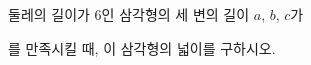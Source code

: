 둘레의 길이가 $6$인 삼각형의 세 변의 길이 $a$, $b$, $c$가\par\smallskip{}\par\smallskip\noindent 를 만족시킬 때, 이 삼각형의 넓이를 구하시오.

